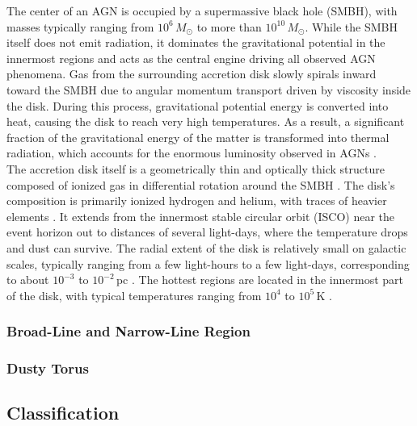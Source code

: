 The center of an AGN is occupied by a supermassive black hole (SMBH), with masses typically ranging from $10^6\,M_\odot$ to more than $10^{10}\,M_\odot$. While the SMBH itself does not emit radiation, it dominates the gravitational potential in the innermost regions and acts as the central engine driving all observed AGN phenomena. Gas from the surrounding accretion disk slowly spirals inward toward the SMBH due to angular momentum transport driven by viscosity inside the disk. During this process, gravitational potential energy is converted into heat, causing the disk to reach very high temperatures. As a result, a significant fraction of the gravitational energy of the matter is transformed into thermal radiation, which accounts for the enormous luminosity observed in AGNs \parencite{netzer2013agn}.\\
The accretion disk itself is a geometrically thin and optically thick structure composed of ionized gas in differential rotation around the SMBH \parencite{shakura1973black}. The disk's composition is primarily ionized hydrogen and helium, with traces of heavier elements \parencite{netzer2013agn}. It extends from the innermost stable circular orbit (ISCO) near the event horizon out to distances of several light-days, where the temperature drops and dust can survive. The radial extent of the disk is relatively small on galactic scales, typically ranging from a few light-hours to a few light-days, corresponding to about $10^{-3}$ to $10^{-2}$\,pc \parencite{netzer2013agn,hickox2018obscured}.  The hottest regions are located in the innermost part of the disk, with typical temperatures ranging from $10^4$ to $10^5$\,K \parencite{hickox2018obscured}. 








\subsubsection{Broad-Line and Narrow-Line Region}



\subsubsection{Dusty Torus}




\subsection{Classification}

